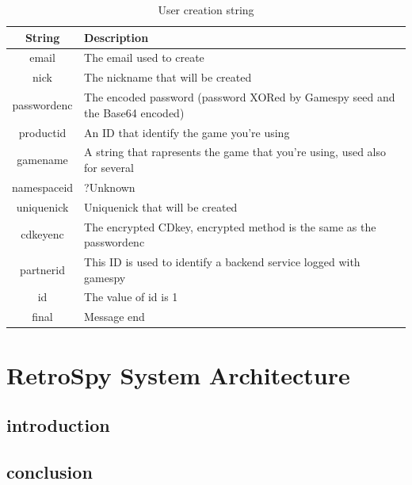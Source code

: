 \documentclass[oneside,titlepage,a4paper]{report} %
\begin{document}
\begin{table}[H]
	\centering
	\begin{tabular}{|c|>{\centering\arraybackslash}p{9cm}|}
		\hline
		  String    & Description                                                                  \\ \hline
		   email    & The email used to create                                                     \\ \hline
		   nick     & The nickname that will be created                                            \\ \hline
		passwordenc & The encoded password (password XORed by Gamespy seed and the Base64 encoded) \\ \hline
		 productid  & An ID that identify the game you're using                                    \\ \hline
		 gamename   & A string that rapresents the game that you're using, used also for several   \\ \hline
		namespaceid & ?Unknown                                                                     \\ \hline
		uniquenick  & Uniquenick that will be created                                              \\ \hline
		 cdkeyenc   & The encrypted CDkey, encrypted method is the same as the passwordenc         \\ \hline
		 partnerid  & This ID is used to identify a backend service logged with gamespy            \\ \hline
		    id      & The value of id is 1                                                         \\ \hline
		   final    & Message end                                                                  \\ \hline
	\end{tabular}
\caption{User creation string}
\label{User creation string}
\end{table}
\part{RetroSpy System Architecture}


\chapter{introduction}

\chapter{conclusion}
\end{document}
